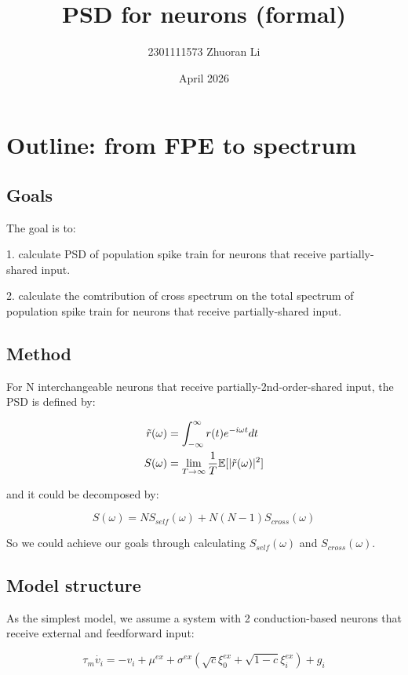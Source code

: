 \documentclass{article}
\title{PSD for neurons (formal)}
\author{2301111573 Zhuoran Li}
\date{April 2026}
\begin{document}
	\maketitle
	\section{Outline: from FPE to spectrum}
	\subsection{Goals}
	The goal is to:
	
	1. calculate PSD of population spike train for neurons that receive partially-shared input.
	
	2. calculate the comtribution of cross spectrum on the total spectrum of population spike train for neurons that receive partially-shared input.
	
	\subsection{Method}
	
	For N interchangeable neurons that receive partially-2nd-order-shared input, the PSD is defined by:
	
	\begin{align}
		\tilde{r}(\omega)&=\int_{-\infty}^{\infty}r(t)e^{-i\omega t}dt\notag\\
		S(\omega)&=\lim\limits_{T\rightarrow \infty}\frac{1}{T}\mathbb{E}[|\tilde{r}(\omega)|^2]
	\end{align}
	
	and it could be decomposed by:
	
	\begin{equation}
	    S(\omega)=NS_{self}(\omega)+N(N-1)S_{cross}(\omega)
	\end{equation}
	
	So we could achieve our goals through calculating $S_{self}(\omega)$ and $S_{cross}(\omega)$.
	
	\subsection{Model structure}
	As the simplest model, we assume a system with 2 conduction-based neurons that receive external and feedforward input:
	
	
	\begin{equation}
		\tau_m \dot{v_i}=-v_i+\mu^{ex}+\sigma^{ex}(\sqrt{c}\xi^{ex}_0+\sqrt{1-c}\xi_{i}^{ex})+{g_i}
	\end{equation}
	
\end{document}
